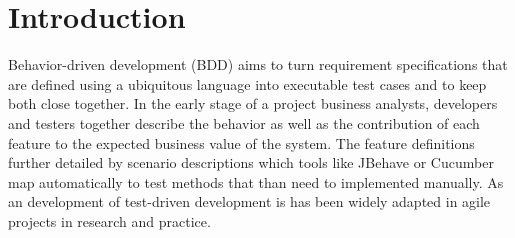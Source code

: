 \documentclass{sig-alternate-05-2015}
\begin{document}
%
%
\printccsdesc






\section{Introduction}
Behavior-driven development (BDD) aims to turn requirement specifications that are defined using a ubiquitous language into executable test cases and to keep both close together.
In the early stage of a project business analysts, developers and testers together describe the behavior as well as the contribution of each feature to the expected business value of the system.
The feature definitions further detailed by scenario descriptions which tools like JBehave or Cucumber map automatically to test methods that than need to implemented manually.
As an development of test-driven development is has been widely adapted in agile projects in research and practice.
\end{document}
